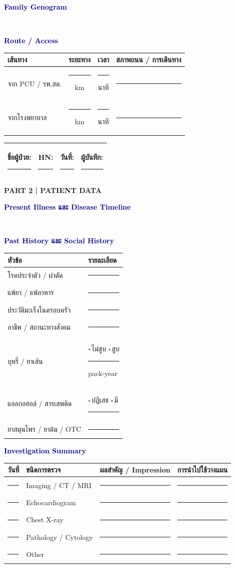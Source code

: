 \documentclass[12pt,a4paper]{article}
\newcommand{\cb}{\(\square\)\,}
\newlength{\blanklen}
\newcommand{\blank}[1][4cm]{\setlength{\blanklen}{#1}\ifdim\blanklen>2cm\setlength{\blanklen}{2cm}\fi\rule{\blanklen}{0.4pt}}
\newcommand{\patientline}{\begin{tabularx}{\textwidth}{|X|X|X|X|}\hline ชื่อผู้ป่วย: \blank[2.8cm] & HN: \blank[1.4cm] & วันที่: \blank[1.4cm] & ผู้บันทึก: \blank[1.5cm]\\\hline\end{tabularx}\vspace{3pt}}
\newcommand{\sectiontitle}[1]{\vspace{4pt}\begin{tcolorbox}[colback=navy,colframe=navy,boxrule=0pt,arc=1pt,left=5pt,right=5pt,top=3pt,bottom=3pt]\color{white}\large\textbf{#1}\end{tcolorbox}}
\newcommand{\sub}[1]{\par\vspace{3pt}\noindent\textcolor{navy}{\large\textbf{#1}}\par\vspace{1pt}}
\newcommand{\lines}[1]{\begin{tcolorbox}[colback=white,colframe=gray!55,boxrule=0.4pt,arc=1pt,height=#1]\ \end{tcolorbox}}
\begin{document}
\sub{Family Genogram}\lines{7.0cm}
\sub{Route / Access}\begin{tabularx}{\textwidth}{|X|c|c|X|}\hline\rowcolor{navy}\color{white}เส้นทาง&\color{white}ระยะทาง&\color{white}เวลา&\color{white}สภาพถนน / การเดินทาง\\\hline จาก PCU / รพ.สต.&\blank[1.5cm] km&\blank[1.5cm] นาที&\blank[5cm]\\\hline จากโรงพยาบาล&\blank[1.5cm] km&\blank[1.5cm] นาที&\blank[5cm]\\\hline\end{tabularx}
\newpage\patientline\sectiontitle{PART 2 | PATIENT DATA}
\sub{Present Illness และ Disease Timeline}\lines{6.3cm}
\sub{Past History และ Social History}
\begin{tabularx}{\textwidth}{|p{}|X|}\hline\rowcolor{navy}\color{white}หัวข้อ&\color{white}รายละเอียด\\\hline โรคประจำตัว / ผ่าตัด&\blank[10cm]\\\hline แพ้ยา / แพ้อาหาร&\blank[10cm]\\\hline ประวัติมะเร็งในครอบครัว&\blank[10cm]\\\hline อาชีพ / สถานะทางสังคม&\blank[10cm]\\\hline บุหรี่ / ยาเส้น&\cb ไม่สูบ \cb สูบ \blank[3cm] pack-year\\\hline แอลกอฮอล์ / สารเสพติด&\cb ปฏิเสธ \cb มี \blank[5cm]\\\hline ยาสมุนไพร / ยาต้ม / OTC&\blank[10cm]\\\hline\end{tabularx}
\sub{Investigation Summary}\begin{tabularx}{\textwidth}{|c|p{3cm}|X|X|}\hline\rowcolor{navy}\color{white}วันที่&\color{white}ชนิดการตรวจ&\color{white}ผลสำคัญ / Impression&\color{white}การนำไปใช้วางแผน\\\hline \blank[1.3cm]&Imaging / CT / MRI&\blank[5cm]&\blank[4cm]\\\hline \blank[1.3cm]&Echocardiogram&\blank[5cm]&\blank[4cm]\\\hline \blank[1.3cm]&Chest X-ray&\blank[5cm]&\blank[4cm]\\\hline \blank[1.3cm]&Pathology / Cytology&\blank[5cm]&\blank[4cm]\\\hline \blank[1.3cm]&Other&\blank[5cm]&\blank[4cm]\\\hline\end{tabularx}
\end{document}
